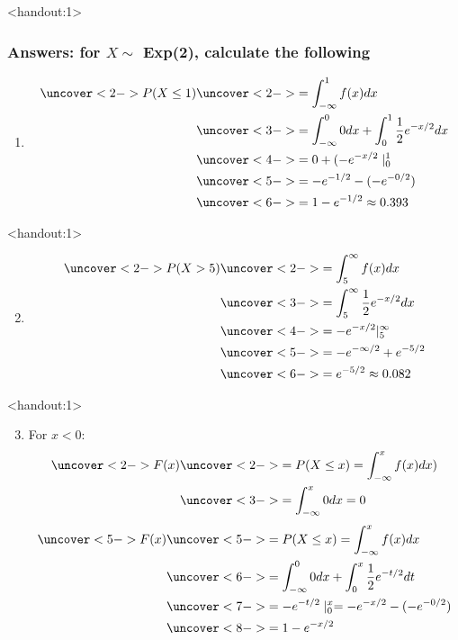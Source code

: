 \documentclass[handout]{beamer}\usepackage[]{graphicx}\usepackage[]{color}
\newcommand{\answers}{1}
\numberwithin{equation}{section}
\begin{document}
\begin{frame}<handout:\answers>
\frametitle{Answers: for $X \sim $ Exp(2), calculate the following}
\begin{enumerate}[1. ]
\item \begin{align*}
\uncover<2->{P(X \le 1)} &\uncover<2->{= \int_{-\infty}^1 f(x) dx} \\
&\uncover<3->{= \int_{-\infty}^0 0 dx +  \int_0^1 \frac{1}{2} e^{-x/2} dx} \\
&\uncover<4->{= 0 + ( -e^{-x/2}\mid_{0}^1} \\
&\uncover<5->{=  -e^{-1/2} - (-  e^{-0/2})} \\
&\uncover<6->{= 1 - e^{-1/2} \approx 0.393}
\end{align*}
\end{enumerate}
\end{frame}

\begin{frame}<handout:\answers>
\begin{enumerate}[1. ]
\setcounter{enumi}{1}
\item \begin{align*}
\uncover<2->{P(X > 5)} & \uncover<2->{= \int_5^\infty f(x) dx} \\
&\uncover<3->{= \int_5 ^\infty \frac{1}{2}e^{-x/2} dx} \\
&\uncover<4->{= -e^{-x/2}|_5^\infty} \\
&\uncover<5->{= -e^{-\infty/2} + e^{-5/2}} \\
&\uncover<6->{= e^{-5/2} \approx 0.082}
\end{align*}
\end{enumerate}
\end{frame}

\begin{frame}<handout:\answers>
\begin{enumerate}[1. ]
\setcounter{enumi}{2}
\item For $x < 0$:
\begin{align*}
\uncover<2->{F(x)} &\uncover<2->{= P(X \le x) = \int_{-\infty}^x f(x) dx)} \\
&\uncover<3->{ = \int_{-\infty}^x 0 dx = 0}
\end{align*}
\begin{align*}
\uncover<5->{F(x)} & \uncover<5->{= P(X \le x) = \int_{-\infty}^x f(x)dx} \\
&\uncover<6->{= \int_{-\infty}^0 0 dx + \int_{0}^x \frac{1}{2}e^{-t/2} dt} \\
&\uncover<7->{= -e^{-t/2}\mid_0^x = -e^{-x/2} - (-e^{-0/2})} \\
& \uncover<8->{= 1 - e^{-x/2}}
\end{align*}
\end{enumerate}
\end{frame}
\end{document}
